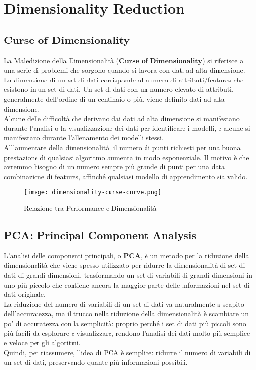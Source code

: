 \chapter{Dimensionality Reduction}
    \section{Curse of Dimensionality}
        La Maledizione della Dimensionalità ($\textbf{Curse of Dimensionality}$) si riferisce a una serie di problemi che sorgono quando si lavora con dati ad alta dimensione.
        \\[1\baselineskip]
        La dimensione di un set di dati corrisponde al numero di attributi/features che esistono in un set di dati.
        Un set di dati con un numero elevato di attributi, generalmente dell'ordine di un centinaio o più, viene definito dati ad alta dimensione.
        \\[1\baselineskip]
        Alcune delle difficoltà che derivano dai dati ad alta dimensione si manifestano durante l'analisi o la visualizzazione dei dati per identificare i modelli, e alcune si manifestano durante l'allenamento dei modelli stessi.
        \\[1\baselineskip]
        All'aumentare della dimensionalità, il numero di punti richiesti per una buona prestazione di qualsiasi algoritmo aumenta in modo esponenziale.
        Il motivo è che avremmo bisogno di un numero sempre più grande di punti per una data combinazione di features, affinché qualsiasi modello di apprendimento sia valido.

        \begin{figure}[h]
            \caption{Relazione tra Performance e Dimensionalità}
            \centering
            \texttt{[image: dimensionality-curse-curve.png]}
        \end{figure}

    \clearpage

    \section{PCA: Principal Component Analysis}
        L'analisi delle componenti principali, o $\textbf{PCA}$, è un metodo per la riduzione della dimensionalità che viene spesso utilizzato per ridurre la dimensionalità di set di dati di grandi dimensioni, trasformando un set di variabili di grandi dimensioni in uno più piccolo che contiene ancora la maggior parte delle informazioni nel set di dati originale.
        \\[1\baselineskip]
        La riduzione del numero di variabili di un set di dati va naturalmente a scapito dell'accuratezza, ma il trucco nella riduzione della dimensionalità è scambiare un po' di accuratezza con la semplicità: proprio perché i set di dati più piccoli sono più facili da esplorare e visualizzare, rendono l'analisi dei dati molto più semplice e veloce per gli algoritmi.
        \\[1\baselineskip]
        Quindi, per riassumere, l'idea di PCA è semplice: ridurre il numero di variabili di un set di dati, preservando quante più informazioni possibili.

